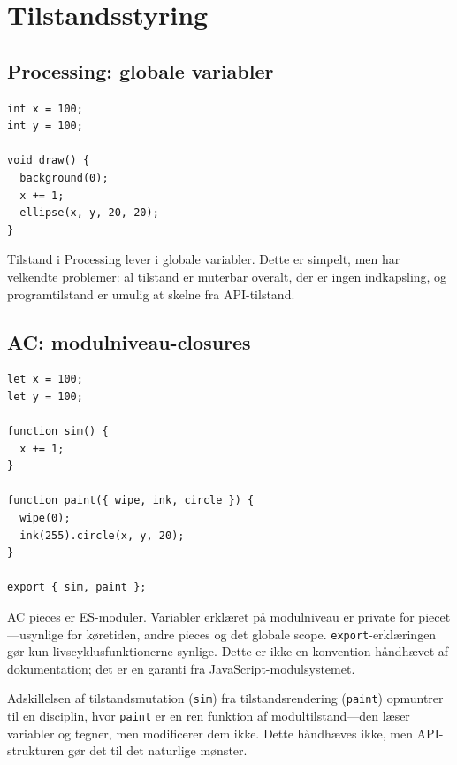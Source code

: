 \documentclass[10pt,letterpaper,twocolumn]{article}
\begin{document}

\section{Tilstandsstyring}
\label{sec:state}

\subsection{Processing: globale variabler}

\begin{lstlisting}[style=processingstyle]
int x = 100;
int y = 100;

void draw() {
  background(0);
  x += 1;
  ellipse(x, y, 20, 20);
}
\end{lstlisting}

Tilstand i Processing lever i globale variabler. Dette er simpelt, men har velkendte problemer: al tilstand er muterbar overalt, der er ingen indkapsling, og programtilstand er umulig at skelne fra API-tilstand.

\subsection{AC: modulniveau-closures}

\begin{lstlisting}[style=acjsstyle]
let x = 100;
let y = 100;

function sim() {
  x += 1;
}

function paint({ wipe, ink, circle }) {
  wipe(0);
  ink(255).circle(x, y, 20);
}

export { sim, paint };
\end{lstlisting}

AC pieces er ES-moduler. Variabler erklæret på modulniveau er private for piecet---usynlige for køretiden, andre pieces og det globale scope. \texttt{export}-erklæringen gør kun livscyklusfunktionerne synlige. Dette er ikke en konvention håndhævet af dokumentation; det er en garanti fra JavaScript-modulsystemet.

Adskillelsen af tilstandsmutation (\texttt{sim}) fra tilstandsrendering (\texttt{paint}) opmuntrer til en disciplin, hvor \texttt{paint} er en ren funktion af modultilstand---den læser variabler og tegner, men modificerer dem ikke. Dette håndhæves ikke, men API-strukturen gør det til det naturlige mønster.

\end{document}
